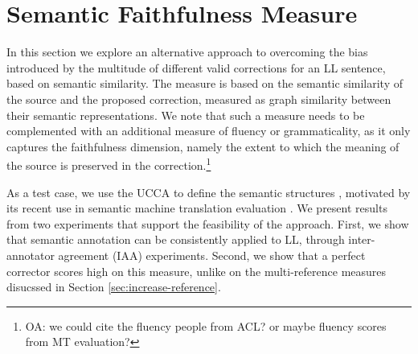 \documentclass[letter,11pt]{article}
\newcommand{\com}[1]{}
\newcommand{\oa}[1]{\footnote{\color{red}OA: #1}}
\newcommand{\lc}[1]{\footnote{\color{green}LC: #1}}
\begin{document}
		\com{\lc{I think this can be omitted}
			So, why is significance more complicated? Basically, because variance is more complex than mean. While $\mathbb{E}_{y\sim d_x, x\sim L}\left(\hat{S}\right)$ vary only as we change $M$
			the number of annotations, but not $N$ the number of corrections,
			$Var_{y\sim d_x, x\sim L}(\hat{S})$ depends on both. We try to assess and give an upper
			bound on how much it varies for different $M$ and $N$, allowing
			for both a smart allocation of resources when building a corpus and for assessing on given corpora whether two correctors are actually different.
		}
		

\section{Semantic Faithfulness Measure}\label{sec:Semantics}



In this section we explore an alternative approach to overcoming the bias
introduced by the multitude of different valid corrections for an LL sentence, based
on semantic similarity.
The measure is based on the semantic similarity of the source and the proposed correction,
measured as graph similarity between their semantic representations.
We note that such a measure needs to be complemented with an additional
measure of fluency or grammaticality, as it only captures
the faithfulness dimension, namely the extent to which
the meaning of the source is preserved in the correction.\oa{we could cite the fluency people from ACL? or maybe fluency scores from MT evaluation?}

As a test case, we use the UCCA to define the semantic structures \cite{abend2013universal}, motivated by
its recent use in semantic machine translation evaluation \cite{birch2016hume}.
We present results from two experiments that support the feasibility of the approach.
First, we show that semantic annotation can be consistently applied to LL,
through inter-annotator agreement (IAA) experiments.
Second, we show that a perfect corrector scores high on this measure, unlike on
the multi-reference measures disucssed in Section \ref{sec:increase-reference}.
\end{document}
